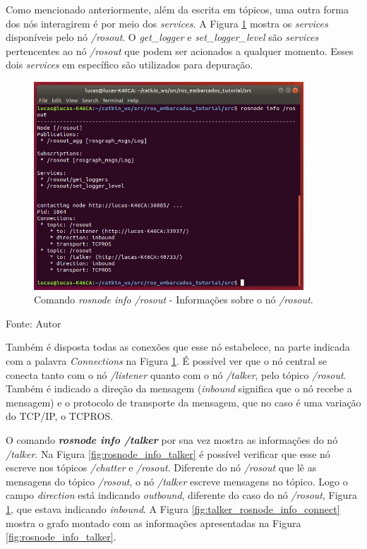Como mencionado anteriormente, além da escrita em tópicos, uma outra forma dos nós interagirem é por meio dos \textit{services}. 
A Figura \ref{fig:rosnode_info_rosout} mostra os \textit{services} disponíveis pelo nó \textit{/rosout}. 
O \textit{get\_logger} e \textit{set\_logger\_level} são \textit{services} pertencentes ao nó \textit{/rosout} que podem ser acionados a qualquer momento.
Esses dois \textit{services} em específico são utilizados para depuração.

\begin{figure}[!htb]
  \centering
  \caption{Comando \textit{rosnode info /rosout} - Informações sobre o nó \textit{/rosout}.}
  \label{fig:rosnode_info_rosout}
  \includegraphics[width=0.9\textwidth]{./img/fundamentacao/rosnode_info_rosout.png}
\end{figure}
Fonte: Autor


Também é disposta todas as conexões que esse nó estabelece, na parte indicada com a palavra \textit{Connections} na Figura \ref{fig:rosnode_info_rosout}. 
É possível ver que o nó central se conecta tanto com o nó \textit{/listener} quanto com o nó \textit{/talker}, pelo tópico \textit{/rosout}. 
Também é indicado a direção da mensagem (\textit{inbound} significa que o nó recebe a mensagem) e o protocolo de transporte da mensagem, que no caso é uma variação do TCP/IP, o TCPROS.

\pagebreak

O comando \textbf{\textit{rosnode info /talker}} por sua vez mostra as informações do nó \textit{/talker}.
Na Figura \ref{fig:rosnode_info_talker} é possível verificar que esse nó escreve nos tópicos \textit{/chatter} e \textit{/rosout}. 
Diferente do nó \textit{/rosout} que lê as mensagens do tópico \textit{/rosout}, o nó \textit{/talker} escreve mensagens no tópico.
Logo o campo \textit{direction} está indicando \textit{outbound}, diferente do caso do nó \textit{/rosout}, Figura \ref{fig:rosnode_info_rosout}, que estava indicando \textit{inbound}.
A Figura \ref{fig:talker_rosnode_info_connect} mostra o grafo montado com as informações apresentadas na Figura \ref{fig:rosnode_info_talker}.

